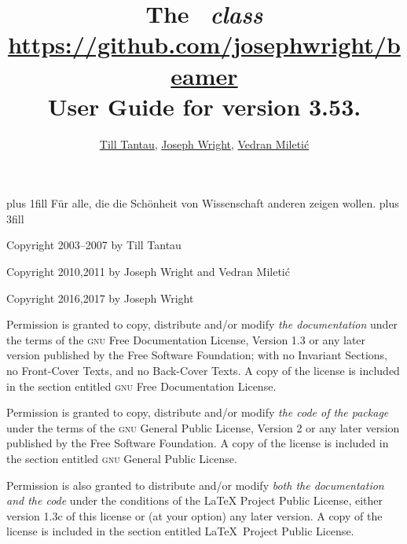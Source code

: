 \documentclass{ltxdoc}
\def\beamerugversion{3.53}
\begin{document}
{
  \vbox{}
  \vskip 0pt plus 1fill
  F\"ur alle, die die Sch\"onheit von Wissenschaft anderen zeigen wollen.
  \vskip 0pt plus 3fill

  \parindent 0pt
  Copyright 2003--2007 by Till Tantau

  Copyright 2010,2011 by Joseph Wright and Vedran Mileti\'c

  Copyright 2016,2017 by Joseph Wright

  \medskip
  Permission is granted to copy, distribute and/or modify \emph{the documentation} under the terms of the \textsc{gnu} Free Documentation License, Version 1.3 or any later version published by the Free Software Foundation; with no Invariant Sections, no Front-Cover Texts, and no Back-Cover Texts. A copy of the license is included in the section entitled \textsc{gnu} Free Documentation License.

  \medskip
  Permission is granted to copy, distribute and/or modify \emph{the code of the package} under the terms of the \textsc{gnu} General Public License, Version 2 or any later version published by the Free Software Foundation. A copy of the license is included in the section entitled \textsc{gnu} General Public License.

  \medskip
  Permission is also granted to distribute and/or modify \emph{both the documentation and the code} under the conditions of the LaTeX Project Public License, either version 1.3c of this license or (at your option) any later version. A copy of the license is included in the section entitled \LaTeX\ Project Public License.

  \vbox{}
  \clearpage
}


\title{\Huge The \beamer\ \textit{class}\\
\Large\url{https://github.com/josephwright/beamer}\\
\Large User Guide for version \beamerugversion.}
\author{\href{mailto:tantau@users.sourceforge.net}{Till Tantau}, \href{mailto:joseph.wright@morningstar2.co.uk}{Joseph Wright}, \href{mailto:vmiletic@inf.uniri.hr}{Vedran Mileti\'c}}

\maketitle
\end{document}
